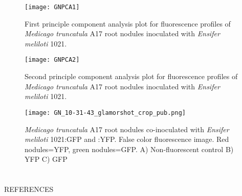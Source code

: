 \documentclass[12pt]{article}
\begin{document}
\begin{doublespace}
	\begin{figure}[H]
		\centering
		\texttt{[image: GNPCA1]}
		\caption{First principle component analysis plot for fluorescence profiles of \textit{Medicago truncatula} A17 root nodules inoculated with \textit{Ensifer meliloti} 1021.}
		\label{fig:PCA1}
	\end{figure}
		
	\begin{figure}[H]
		\centering
		\texttt{[image: GNPCA2]}
		\caption{Second principle component analysis plot for fluorescence profiles of \textit{Medicago truncatula} A17 root nodules inoculated with \textit{Ensifer meliloti} 1021.}
		\label{fig:PCA2}
	\end{figure}
	
	\begin{figure}[H]
		\centering
		\texttt{[image: GN\_10-31-43\_glamorshot\_crop\_pub.png]}
		\caption{\textit{Medicago truncatula} A17 root nodules co-inoculated with \textit{Ensifer meliloti} 1021:GFP and :YFP. False color fluorescence image. Red nodules=YFP, green nodules=GFP. A) Non-fluorescent control B) YFP C) GFP}
		\label{fig:xmas}
	\end{figure}
	
\end{doublespace}

\newpage
\section*{} %
\begin{center}
\vfill
REFERENCES
\vfill
\end{center}

\newpage

\renewcommand\refname{\centering\large{REFERENCES\linebreak[2]}} %



\end{document}
